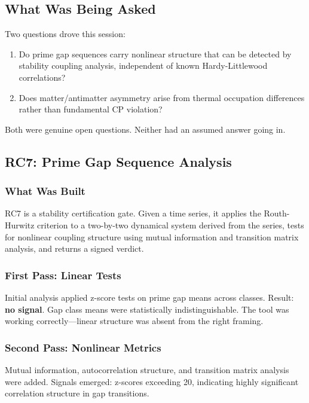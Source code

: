 \documentclass[11pt]{article}
\begin{document}
\subsection{What Was Being Asked}

Two questions drove this session:

\begin{enumerate}
  \item Do prime gap sequences carry nonlinear structure that can be detected by stability coupling analysis, independent of known Hardy-Littlewood correlations?
  \item Does matter/antimatter asymmetry arise from thermal occupation differences rather than fundamental CP violation?
\end{enumerate}

Both were genuine open questions. Neither had an assumed answer going in.

\subsection{RC7: Prime Gap Sequence Analysis}

\subsubsection{What Was Built}

RC7 is a stability certification gate. Given a time series, it applies the Routh-Hurwitz criterion to a two-by-two dynamical system derived from the series, tests for nonlinear coupling structure using mutual information and transition matrix analysis, and returns a signed verdict.

\subsubsection{First Pass: Linear Tests}

Initial analysis applied z-score tests on prime gap means across classes. Result: \textbf{no signal}. Gap class means were statistically indistinguishable. The tool was working correctly---linear structure was absent from the right framing.

\subsubsection{Second Pass: Nonlinear Metrics}

Mutual information, autocorrelation structure, and transition matrix analysis were added. Signals emerged: z-scores exceeding 20, indicating highly significant correlation structure in gap transitions.
\end{document}

